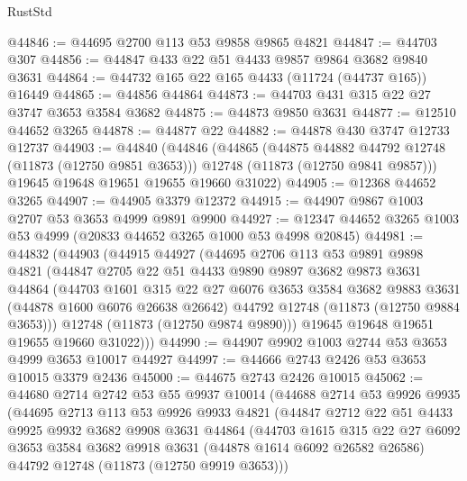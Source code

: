 \begin{lexlean}{RustStd}
\begin{coremodule}
@44846 := @44695 @2700 @113 @53 @9858 @9865 @4821
@44847 := @44703 @307
@44856 := @44847 @433 @22 @51 @4433 @9857 @9864 @3682 @9840 @3631
@44864 := @44732 @165 @22 @165 @4433 (@11724 (@44737 @165)) @16449
@44865 := @44856 @44864
@44873 := @44703 @431 @315 @22 @27 @3747 @3653 @3584 @3682
@44875 := @44873 @9850 @3631
@44877 := @12510 @44652 @3265
@44878 := @44877 @22
@44882 := @44878 @430 @3747 @12733 @12737
@44903 := @44840
    (@44846
      (@44865
        (@44875 @44882 @44792 @12748 (@11873 (@12750 @9851 @3653)))
        @12748
        (@11873 (@12750 @9841 @9857)))
      @19645
      @19648
      @19651
      @19655
      @19660
      @31022)
@44905 := @12368 @44652 @3265
@44907 := @44905 @3379 @12372
@44915 := @44907 @9867 @1003 @2707 @53 @3653 @4999 @9891 @9900
@44927 := @12347 @44652 @3265 @1003 @53 @4999 (@20833 @44652 @3265 @1000 @53 @4998 @20845)
@44981 := @44832
    (@44903
      (@44915
        @44927
        (@44695
          @2706
          @113
          @53
          @9891
          @9898
          @4821
          (@44847
            @2705
            @22
            @51
            @4433
            @9890
            @9897
            @3682
            @9873
            @3631
            @44864
            (@44703
              @1601
              @315
              @22
              @27
              @6076
              @3653
              @3584
              @3682
              @9883
              @3631
              (@44878 @1600 @6076 @26638 @26642)
              @44792
              @12748
              (@11873 (@12750 @9884 @3653)))
            @12748
            (@11873 (@12750 @9874 @9890)))
          @19645
          @19648
          @19651
          @19655
          @19660
          @31022)))
@44990 := @44907 @9902 @1003 @2744 @53 @3653 @4999 @3653 @10017 @44927
@44997 := @44666 @2743 @2426 @53 @3653 @10015 @3379 @2436
@45000 := @44675 @2743 @2426 @10015
@45062 := @44680
    @2714
    @2742
    @53
    @55
    @9937
    @10014
    (@44688
      @2714
      @53
      @9926
      @9935
      (@44695
        @2713
        @113
        @53
        @9926
        @9933
        @4821
        (@44847
          @2712
          @22
          @51
          @4433
          @9925
          @9932
          @3682
          @9908
          @3631
          @44864
          (@44703
            @1615
            @315
            @22
            @27
            @6092
            @3653
            @3584
            @3682
            @9918
            @3631
            (@44878 @1614 @6092 @26582 @26586)
            @44792
            @12748
            (@11873 (@12750 @9919 @3653)))

\end{coremodule}
\end{lexlean}
